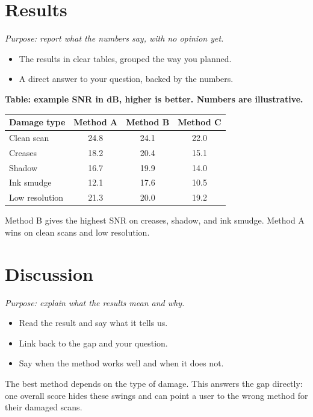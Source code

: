\documentclass[11pt]{article}
\begin{document}
\section{Results}
\textit{Purpose: report what the numbers say, with no opinion yet.}

\begin{itemize}
\item The \textcolor{cResult}{results} in clear tables, grouped the way you planned.
\item A direct answer to your question, backed by the numbers.
\end{itemize}

 \textbf{Table: example SNR in dB, higher is better. Numbers are illustrative.}

\begin{tabular}{lccc}
\toprule
\textbf{Damage type} & \textbf{Method A} & \textbf{Method B} & \textbf{Method C} \\
\midrule
Clean scan & 24.8 & 24.1 & 22.0 \\
Creases & 18.2 & 20.4 & 15.1 \\
Shadow & 16.7 & 19.9 & 14.0 \\
Ink smudge & 12.1 & 17.6 & 10.5 \\
Low resolution & 21.3 & 20.0 & 19.2 \\
\bottomrule
\end{tabular}

\textcolor{cResult}{Method B gives the highest SNR on creases, shadow, and ink smudge. Method A wins on clean scans and low resolution.}

\section{Discussion}
\textit{Purpose: explain what the results mean and why.}

\begin{itemize}
\item Read the \textcolor{cResult}{result} and say what it tells us.
\item Link back to the \textcolor{cGap}{gap} and your question.
\item Say when the method works well and when it does not.
\end{itemize}


\textcolor{cResult}{The best method depends on the type of damage.} This \textcolor{cGap}{answers the gap directly}: one overall score hides these swings and can point a user to the wrong method for their damaged scans.
\end{document}
